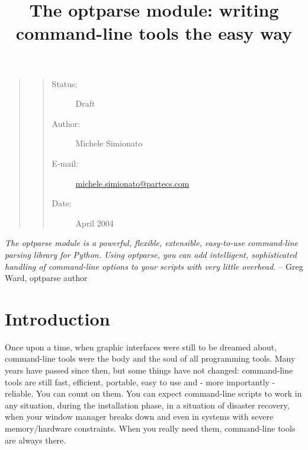 \documentclass[10pt,english]{article}
\title{The optparse module: writing command-line tools the easy way}
\author{}
\date{}
\newlength{\locallinewidth}
\begin{document}
\maketitle


\setlength{\locallinewidth}{\linewidth}
\begin{quote}
\begin{quote}
\begin{description}
\item [Status:]
Draft


\item [Author:]
Michele Simionato


\item [E-mail:]
\href{mailto:michele.simionato@partecs.com}{michele.simionato@partecs.com}


\item [Date:]
April 2004


\end{description}
\end{quote}
\end{quote}

\emph{The optparse module is a powerful, flexible, extensible, easy-to-use 
command-line parsing library for Python. Using optparse, you can add 
intelligent, sophisticated handling of command-line options to your 
scripts with very little overhead.} -- Greg Ward, optparse author



\hypertarget{introduction}{}
\section*{Introduction}

Once upon a time, when graphic interfaces were still to be dreamed
about, command-line tools were the body and the soul of all programming
tools. Many years have passed since then, but some things have not 
changed: command-line tools are still fast, efficient, portable, easy 
to use and - more importantly - reliable. You can count on them.
You can expect command-line scripts to work in any situation, 
during the installation phase, in a situation of disaster recovery, when 
your window manager breaks down and even in systems with severe 
memory/hardware constraints. When you really need them, command-line 
tools are always there.
\end{document}
